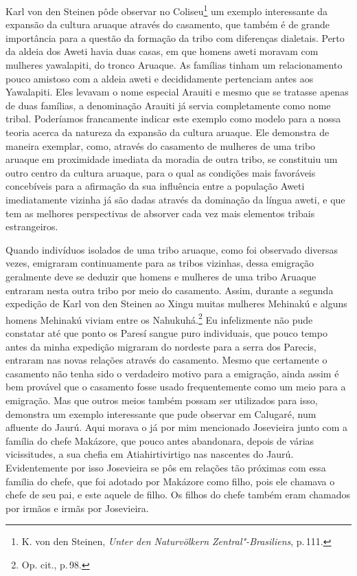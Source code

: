 Karl von den Steinen pôde observar no Coliseu\footnote{K. von den
  Steinen, \textit{Unter den Naturvölkern Zentral"-Brasiliens}, p.\,111.} um
exemplo interessante da expansão da cultura aruaque através do
casamento, que também é de grande importância para a questão da formação
da tribo com diferenças dialetais. Perto da aldeia dos Aweti havia duas
casas, em que homens aweti moravam com mulheres yawalapiti, do tronco
Aruaque. As famílias tinham um relacionamento pouco amistoso com a
aldeia aweti e decididamente pertenciam antes aos Yawalapiti. Eles
levavam o nome especial Arauiti e mesmo que se tratasse apenas de duas
famílias, a denominação Arauiti já servia completamente como nome
tribal. Poderíamos francamente indicar este exemplo como modelo para a
nossa teoria acerca da natureza da expansão da cultura aruaque. Ele
demonstra de maneira exemplar, como, através do casamento de mulheres de
uma tribo aruaque em proximidade imediata da moradia de outra tribo, se
constituiu um outro centro da cultura aruaque, para o qual as condições
mais favoráveis concebíveis para a afirmação da sua influência entre a
população Aweti imediatamente vizinha já são dadas através da dominação
da língua aweti, e que tem as melhores perspectivas de absorver cada vez
mais elementos tribais estrangeiros.

Quando indivíduos isolados de uma tribo aruaque, como foi observado
diversas vezes, emigraram continuamente para as tribos vizinhas, dessa
emigração geralmente deve se deduzir que homens e mulheres de uma tribo
Aruaque entraram nesta outra tribo por meio do casamento. Assim, durante
a segunda expedição de Karl von den Steinen ao Xingu muitas mulheres
Mehinakú e alguns homens Mehinakú viviam entre os Nahukuhá.\footnote{Op.
  cit., p.\,98.} Eu infelizmente não pude constatar até que ponto os
Paresí sangue puro individuais, que pouco tempo antes da minha expedição
migraram do nordeste para a serra dos Parecis, entraram nas novas
relações através do casamento. Mesmo que certamente o casamento não
tenha sido o verdadeiro motivo para a emigração, ainda assim é bem
provável que o casamento fosse usado frequentemente como um meio para a
emigração. Mas que outros meios também possam ser utilizados para isso,
demonstra um exemplo interessante que pude observar em Calugaré, num
afluente do Jaurú. Aqui morava o já por mim mencionado Josevieira junto
com a família do chefe Makázore, que pouco antes abandonara, depois de
várias vicissitudes, a sua chefia em Atiahirtivirtigo nas nascentes do
Jaurú. Evidentemente por isso Josevieira se pôs em relações tão
próximas com essa família do chefe, que foi adotado por Makázore como
filho, pois ele chamava o chefe de seu pai, e este aquele de filho. Os
filhos do chefe também eram chamados por irmãos e irmãs por Josevieira.

